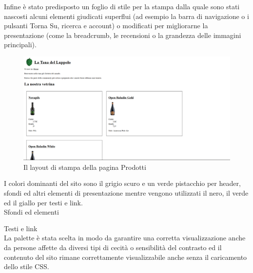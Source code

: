 Infine è stato predisposto un foglio di stile per la stampa dalla quale sono stati nascosti alcuni elementi giudicati superflui (ad esempio la barra di navigazione o i pulsanti Torna Su, ricerca e account) o modificati per migliorarne la presentazione (come la breadcrumb, le recensioni o la grandezza delle immagini principali).

\begin{figure}[H]
	\centering
	\caption{Il layout di stampa della pagina Prodotti}
	\includegraphics[width=16cm]{utility/prodotti_printcss.png}
\end{figure}

I colori dominanti del sito sono il grigio scuro e un verde pistacchio per header, sfondi ed altri elementi di presentazione mentre vengono utilizzati il nero, il verde ed il giallo per testi e link.\\

Sfondi ed elementi
\crule[hdgray]{1cm}{1cm} \crule[pistacho]{1cm}{1cm} \crule[puffo]{1cm}{1cm} 


Testi e link
\crule{1cm}{1cm} \crule[yellow]{1cm}{1cm} \crule[bcgreen]{1cm}{1cm} \crule[hdgreen]{1cm}{1cm}
\\

La palette è stata scelta in modo da garantire una corretta visualizzazione anche da persone affette da diversi tipi di cecità o sensibilità del contrasto ed il contenuto del sito rimane correttamente visualizzabile anche senza il caricamento dello stile CSS.

